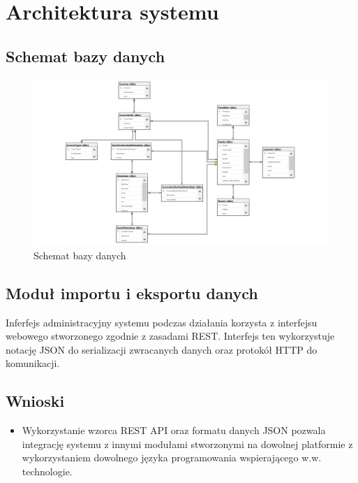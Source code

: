 \newpage\section{Architektura systemu \NazwaSys}\label{sec:model}
\subsection{Schemat bazy danych} 
\begin{figure}[h!]
\centering
\includegraphics[width=16cm]{BD.png}
\caption{Schemat bazy danych}
\label{fig:schemat}
\end{figure}

\subsection{Moduł importu i eksportu danych}
Inferfejs administracyjny systemu podczas działania korzysta z interfejsu webowego stworzonego zgodnie z zasadami REST. Interfejs ten wykorzystuje notację JSON do serializacji zwracanych danych oraz protokół HTTP do komunikacji.

\subsection{Wnioski}
\begin{itemize}
    \item Wykorzystanie wzorca REST API oraz formatu danych JSON pozwala integrację systemu z innymi modułami stworzonymi na dowolnej platformie z wykorzystaniem dowolnego języka programowania wspierającego w.w. technologie.
\end{itemize}
